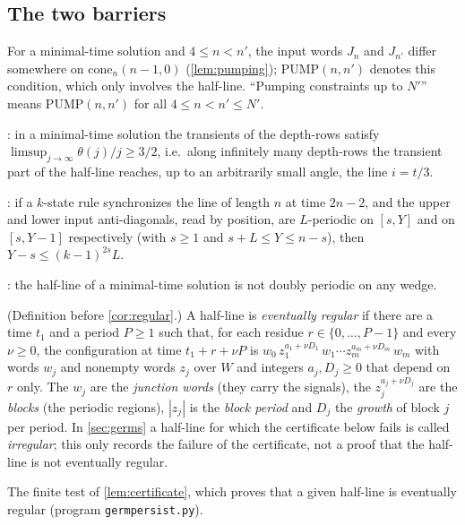 {\subsection{The two barriers}\label{app:gl-barriers}
\begin{description}[style=unboxed,leftmargin=1em,font=\normalfont\bfseries,itemsep=1pt,parsep=0pt,topsep=2pt]
\item[Pumping lemma; $\mathrm{PUMP}(n,n')$.] For a minimal-time solution
  and $4\le n<n'$, the input words $J_n$ and $J_{n'}$ differ somewhere on
  $\mathrm{cone}_n(n-1,0)$ (\cref{lem:pumping}); $\mathrm{PUMP}(n,n')$
  denotes this condition, which only involves the half-line. ``Pumping
  constraints up to $N'$'' means $\mathrm{PUMP}(n,n')$ for all $4\le
  n<n'\le N'$.
\item[Speed-$1/3$ barrier.] : in a minimal-time solution
  the transients of the depth-rows satisfy $\limsup_{j\to\infty}\theta(j)/j\ge
  3/2$, i.e.\ along infinitely many depth-rows the transient part of the
  half-line reaches, up to an arbitrarily small angle, the line $i=t/3$.
\item[Left-border lemma.] : if a $k$-state rule
  synchronizes the line of length $n$ at time $2n-2$, and the upper and
  lower input anti-diagonals, read by position, are $L$-periodic on
  $[s,Y]$ and on $[s,Y-1]$ respectively (with $s\ge1$ and $s+L\le Y\le
  n-s$), then $Y-s\le(k-1)^{2s}L$.
\item[Left-border barrier.] : the half-line of a
  minimal-time solution is not doubly periodic on any wedge.
\item[Eventually regular; junction words; blocks.] (Definition before
  \cref{cor:regular}.) A half-line is \emph{eventually regular} if there
  are a time $t_1$ and a period $P\ge1$ such that, for each residue
  $r\in\{0,\dots,P-1\}$ and every $\nu\ge0$, the configuration at time
  $t_1+r+\nu P$ is $w_0\,z_1^{a_1+\nu D_1}\,w_1\cdots z_m^{a_m+\nu D_m}\,w_m$
  with words $w_j$ and nonempty words $z_j$ over $W$ and integers
  $a_j,D_j\ge0$ that depend on $r$ only. The $w_j$ are the \emph{junction words} (they carry the
  signals), the $z_j^{a_j+\nu D_j}$ are the \emph{blocks} (the periodic
  regions), $|z_j|$ is the \emph{block period} and $D_j$ the
  \emph{growth} of block $j$ per period. In \cref{sec:germs} a half-line
  for which the certificate below fails is called \emph{irregular}; this
  only records the failure of the certificate, not a proof that the
  half-line is not eventually regular.
\item[Regularity certificate.] The finite test of \cref{lem:certificate},
  which proves that a given half-line is eventually
  regular (program \texttt{germpersist.py}).
\end{description}

}
